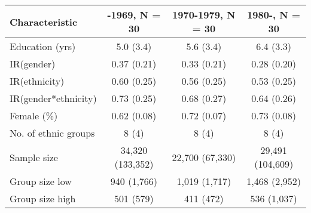 
\begin{tabular}{lccc}
\toprule
\textbf{Characteristic} & \textbf{-1969}, N = 30 & \textbf{1970-1979}, N = 30 & \textbf{1980-}, N = 30\\
\midrule
Education (yrs) & 5.0 (3.4) & 5.6 (3.4) & 6.4 (3.3)\\
IR(gender) & 0.37 (0.21) & 0.33 (0.21) & 0.28 (0.20)\\
IR(ethnicity) & 0.60 (0.25) & 0.56 (0.25) & 0.53 (0.25)\\
IR(gender*ethnicity) & 0.73 (0.25) & 0.68 (0.27) & 0.64 (0.26)\\
Female (\%) & 0.62 (0.08) & 0.72 (0.07) & 0.73 (0.08)\\
No. of ethnic groups & 8 (4) & 8 (4) & 8 (4)\\
Sample size & 34,320 (133,352) & 22,700 (67,330) & 29,491 (104,609)\\
Group size low & 940 (1,766) & 1,019 (1,717) & 1,468 (2,952)\\
Group size high & 501 (579) & 411 (472) & 536 (1,037)\\
\bottomrule
\end{tabular}
